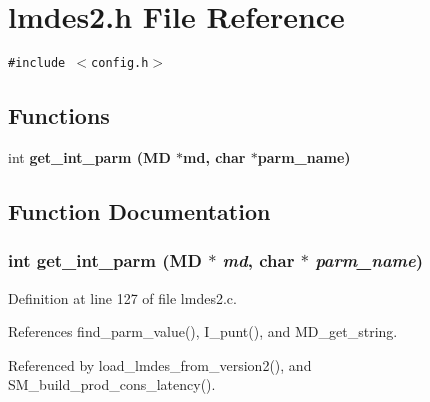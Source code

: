 \section{lmdes2.h File Reference}
\label{lmdes2_8h}
{\tt \#include $<$config.h$>$}\par
\subsection*{Functions}
\begin{CompactItemize}
\item 
int \bf{get\_\-int\_\-parm} (\bf{MD} $\ast$md, char $\ast$parm\_\-name)
\end{CompactItemize}


\subsection{Function Documentation}
\subsubsection{\setlength{\rightskip}{0pt plus 5cm}int get\_\-int\_\-parm (\bf{MD} $\ast$ {\em md}, char $\ast$ {\em parm\_\-name})}\label{lmdes2_8h_b72d20b5453850f8f529b452f87f0c6b}




Definition at line 127 of file lmdes2.c.

References find\_\-parm\_\-value(), I\_\-punt(), and MD\_\-get\_\-string.

Referenced by load\_\-lmdes\_\-from\_\-version2(), and SM\_\-build\_\-prod\_\-cons\_\-latency().
